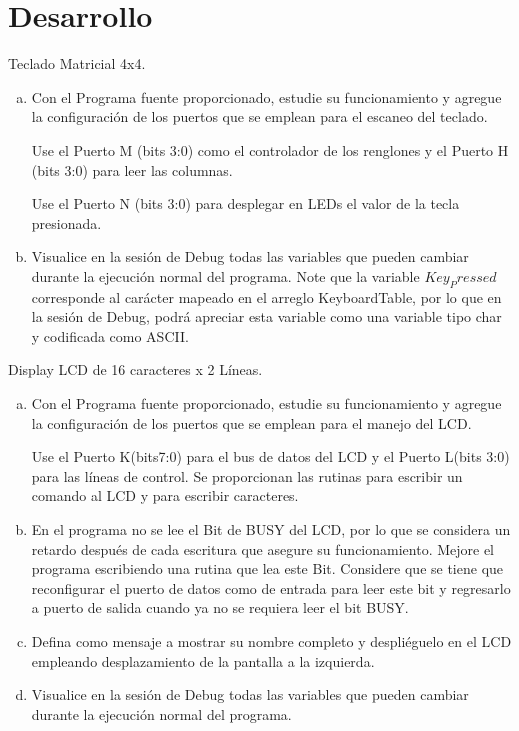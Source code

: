 \documentclass[a4paper,11pt]{article}                 %
\begin{document}
\section{Desarrollo}
 Teclado Matricial 4x4. 
 
 \begin{enumerate}[a)]
 \item Con el Programa fuente proporcionado, estudie su funcionamiento y agregue la  configuración de los puertos que se emplean para el escaneo del teclado. 
 
 Use el Puerto M (bits 3:0) como el controlador de los renglones y el Puerto H (bits 3:0) para leer las columnas.  
 
 Use el Puerto N (bits 3:0) para desplegar en LEDs el valor de la tecla presionada. 
 
 \item  Visualice en la sesión de Debug todas las variables que pueden cambiar durante la ejecución normal del programa. Note que la variable $Key_Pressed$ corresponde al carácter mapeado en el arreglo KeyboardTable, por lo que en la sesión de Debug, podrá apreciar esta variable como una variable tipo char y codificada como ASCII. 
\end{enumerate}
 
 Display LCD de 16 caracteres x 2 Líneas. 
 
  \begin{enumerate}[a)]
 	\item  Con el Programa fuente proporcionado, estudie su funcionamiento y agregue la  configuración de los puertos que se emplean para el manejo del LCD.  
 	
 	Use el Puerto K(bits7:0) para el bus de datos del LCD y el Puerto L(bits 3:0) para las líneas de control.  Se proporcionan las rutinas para escribir un comando al LCD y para escribir caracteres.  
 	
 	
 	\item  En el programa no se lee el Bit de BUSY del LCD, por lo que se considera un retardo después de cada escritura que asegure su funcionamiento. Mejore el programa escribiendo una rutina que lea este Bit. Considere que se tiene que reconfigurar el puerto de datos como de entrada para leer este bit y regresarlo a puerto de salida cuando ya no se requiera leer el bit BUSY.
 	
 	\item  Defina como mensaje a mostrar su nombre completo y despliéguelo en el LCD empleando desplazamiento de la pantalla a la izquierda.  
 	
 	\item  Visualice en la sesión de Debug todas las variables que pueden cambiar durante la ejecución normal del programa. 
 	
 \end{enumerate}
 
\end{document}
